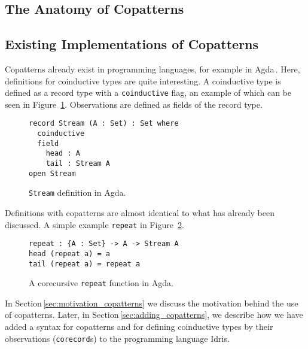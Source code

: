 \subsection{The Anatomy of Copatterns}

\subsection{Existing Implementations of Copatterns}
Copatterns already exist in programming languages, for example in
Agda\,\cite{Norell:thesis}. Here, definitions for coinductive types are quite
interesting. A coinductive type is defined as a record type with a
\texttt{coinductive} flag, an example of which can be seen in
Figure~\ref{fig:agda_stream}. Observations are defined as fields of the record
type.

\begin{figure}[h]
\begin{lstlisting}[mathescape]
record Stream (A : Set) : Set where
  coinductive
  field
    head : A
    tail : Stream A
open Stream
\end{lstlisting}
\caption{\texttt{Stream} definition in Agda.}
\label{fig:agda_stream}
\end{figure}

Definitions with copatterns are almost identical to what has already been
discussed. A simple example \texttt{repeat} in Figure~\ref{fig:agda_repeat}. 

\begin{figure}[h]
\begin{lstlisting}[mathescape]
repeat : {A : Set} -> A -> Stream A
head (repeat a) = a
tail (repeat a) = repeat a 
\end{lstlisting}
\caption{A corecursive \texttt{repeat} function in Agda.}
\label{fig:agda_repeat}
\end{figure}

In Section\,\ref{sec:motivation_copatterns} we discuss the motivation behind the
use of copatterns. Later, in Section\,\ref{sec:adding_copatterns}, we describe
how we have added a syntax for copatterns and for defining coinductive types by
their observations (\texttt{corecord}s) to the programming language Idris.

